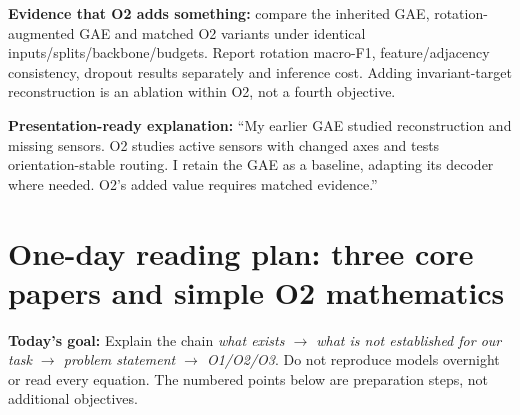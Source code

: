 \documentclass[10pt]{article}
\begin{document}
\textbf{Evidence that O2 adds something:} compare the inherited GAE, rotation-augmented GAE and matched O2 variants under identical inputs/splits/backbone/budgets. Report rotation macro-F1, feature/adjacency consistency, dropout results separately and inference cost. Adding invariant-target reconstruction is an ablation within O2, not a fourth objective.

\textbf{Presentation-ready explanation:} ``My earlier GAE studied reconstruction and missing sensors. O2 studies active sensors with changed axes and tests orientation-stable routing. I retain the GAE as a baseline, adapting its decoder where needed. O2's added value requires matched evidence.''

\clearpage
\section*{One-day reading plan: three core papers and simple O2 mathematics}
\textbf{Today's goal:} Explain the chain \emph{what exists $\rightarrow$ what is not established for our task $\rightarrow$ problem statement $\rightarrow$ O1/O2/O3}. Do not reproduce models overnight or read every equation. The numbered points below are preparation steps, not additional objectives.
\end{document}
